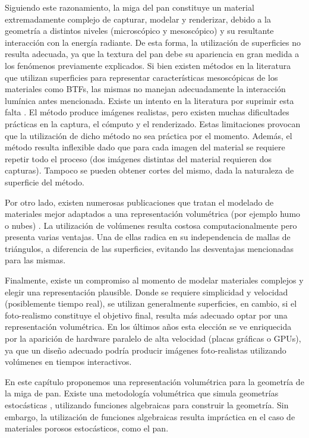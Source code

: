 Siguiendo este razonamiento, la miga del pan constituye un material extremadamente complejo de capturar, modelar y renderizar, debido a la geometría a distintos niveles (microscópico y mesoscópico) y su resultante interacción con la energía radiante.
De esta forma, la utilización de superficies no resulta adecuada, ya que la textura del pan debe su apariencia en gran medida a los fenómenos previamente explicados.
Si bien existen métodos en la literatura que utilizan superficies para representar características mesoscópicas de los materiales como BTFs, las mismas no manejan adecuadamente la interacción lumínica antes mencionada.
Existe un intento en la literatura por suprimir esta falta \cite{Tong2005}.
El método produce imágenes realistas, pero existen muchas dificultades prácticas en la captura, el cómputo y el renderizado.
Estas limitaciones provocan que la utilización de dicho método no sea práctica por el momento.
Además, el método resulta inflexible dado que para cada imagen del material se requiere repetir todo el proceso (dos imágenes distintas del material requieren dos capturas).
Tampoco se pueden obtener cortes del mismo, dada la naturaleza de superficie del método.

Por otro lado, existen numerosas publicaciones que tratan el modelado de materiales mejor adaptados a una representación volumétrica (por ejemplo humo o nubes) \cite{Chentanez2011,Zhou2008}.
La utilización de volúmenes resulta costosa computacionalmente pero presenta varias ventajas.
Una de ellas radica en su independencia de mallas de triángulos, a diferencia de las superficies, evitando las desventajas mencionadas para las mismas.

Finalmente, existe un compromiso al momento de modelar materiales complejos y elegir una representación plausible.
Donde se requiere simplicidad y velocidad (posiblemente tiempo real), se utilizan generalmente superficies, en cambio, si el foto-realismo constituye el objetivo final, resulta más adecuado optar por una representación volumétrica.
En los últimos años esta elección se ve enriquecida por la aparición de hardware paralelo de alta velocidad (placas gráficas o GPUs), ya que un diseño adecuado podría producir imágenes foto-realistas utilizando volúmenes en tiempos interactivos.

En este capítulo proponemos una representación volumétrica para la geometría de la miga de pan.
Existe una metodología volumétrica que simula geometrías estocásticas \cite{Perlin1989}, utilizando funciones algebraicas para construir la geometría.
Sin embargo, la utilización de funciones algebraicas resulta impráctica en el caso de materiales porosos estocásticos, como el pan.

